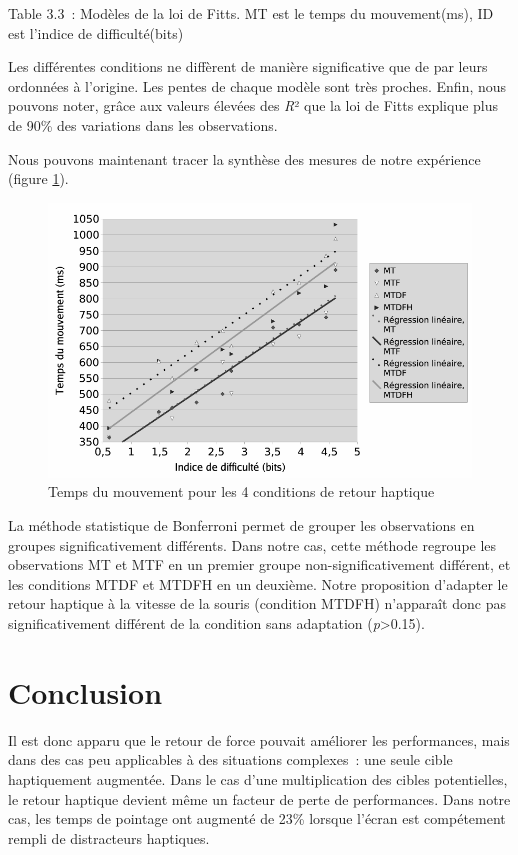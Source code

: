 \documentclass[
]{book}
\begin{document}
Table 3.3~: Modèles de la loi de Fitts.
MT est le temps du mouvement(ms), ID est l'indice de
difficulté(bits)

Les différentes conditions ne diffèrent de manière significative que de
par leurs ordonnées à l'origine. Les pentes de chaque modèle sont très
proches. Enfin, nous pouvons noter, grâce aux valeurs élevées des
\emph{R}² que la loi de Fitts explique plus de 90\% des
variations dans les observations.

Nous pouvons maintenant tracer la synthèse des mesures de notre expérience
(figure \ref{fig:synthese}).

\begin{figure}
\centering
\includegraphics{img/synth.png}
\caption{\label{fig:synthese}Temps du mouvement pour les 4 conditions de retour
haptique}
\end{figure}

La méthode statistique de Bonferroni permet de grouper les observations en
groupes significativement différents. Dans notre cas, cette méthode regroupe
les observations MT et MTF en un premier groupe non-significativement
différent, et les conditions MTDF et MTDFH en un deuxième. Notre proposition
d'adapter le retour haptique à la vitesse de la souris (condition MTDFH)
n'apparaît donc pas significativement différent de la condition sans
adaptation (\emph{p}\textgreater0.15).

\hypertarget{conclusion-2}{%
\section{Conclusion}\label{conclusion-2}}

Il est donc apparu que le retour de force pouvait améliorer les
performances, mais dans des cas peu applicables à des situations complexes~:
une seule cible haptiquement augmentée. Dans le cas d'une multiplication des
cibles potentielles, le retour haptique devient même un facteur de perte de
performances. Dans notre cas, les temps de pointage ont augmenté de 23\%
lorsque l'écran est compétement rempli de distracteurs haptiques.
\end{document}
